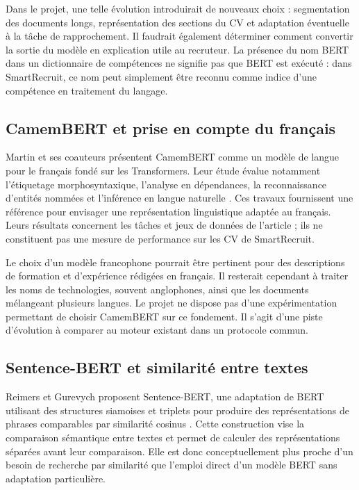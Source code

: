 Dans le projet, une telle évolution introduirait de nouveaux choix : segmentation des documents longs, représentation des sections du CV et adaptation éventuelle à la tâche de rapprochement. Il faudrait également déterminer comment convertir la sortie du modèle en explication utile au recruteur. La présence du nom BERT dans un dictionnaire de compétences ne signifie pas que BERT est exécuté : dans SmartRecruit, ce nom peut simplement être reconnu comme indice d'une compétence en traitement du langage.

\subsection{CamemBERT et prise en compte du français}

Martin et ses coauteurs présentent CamemBERT comme un modèle de langue pour le français fondé sur les Transformers. Leur étude évalue notamment l'étiquetage morphosyntaxique, l'analyse en dépendances, la reconnaissance d'entités nommées et l'inférence en langue naturelle \cite{martin2020}. Ces travaux fournissent une référence pour envisager une représentation linguistique adaptée au français. Leurs résultats concernent les tâches et jeux de données de l'article ; ils ne constituent pas une mesure de performance sur les CV de SmartRecruit.

Le choix d'un modèle francophone pourrait être pertinent pour des descriptions de formation et d'expérience rédigées en français. Il resterait cependant à traiter les noms de technologies, souvent anglophones, ainsi que les documents mélangeant plusieurs langues. Le projet ne dispose pas d'une expérimentation permettant de choisir CamemBERT sur ce fondement. Il s'agit d'une piste d'évolution à comparer au moteur existant dans un protocole commun.

\subsection{Sentence-BERT et similarité entre textes}

Reimers et Gurevych proposent Sentence-BERT, une adaptation de BERT utilisant des structures siamoises et triplets pour produire des représentations de phrases comparables par similarité cosinus \cite{reimers2019}. Cette construction vise la comparaison sémantique entre textes et permet de calculer des représentations séparées avant leur comparaison. Elle est donc conceptuellement plus proche d'un besoin de recherche par similarité que l'emploi direct d'un modèle BERT sans adaptation particulière.

